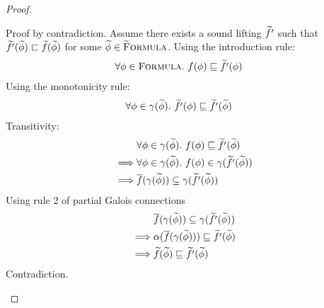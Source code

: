 \begin{proof}
\begin{description}
        Proof by contradiction.
        Assume there exists a sound lifting $\widetilde{f'}$ such that $\widetilde{f'}(\widetilde{\phi}) \sqsubset \widetilde{f}(\widetilde{\phi})$ for some $\widetilde{\phi} \in \textup{\textsc{\ensuremath{\widetilde{\text{F}}}ormula}}$.
        Using the introduction rule:
        \begin{align*}
        &\forall \phi \in \textup{\textsc{Formula}}.~ f(\phi) \sqsubseteq \widetilde{f'}(\phi)
        \end{align*}
        Using the monotonicity rule:
        \begin{align*}
        &\forall \phi \in \gamma(\widetilde{\phi}).~ \widetilde{f'}(\phi) \sqsubseteq \widetilde{f'}(\widetilde{\phi})
        \end{align*}
        Transitivity:
        \begin{align*}
        &\forall \phi \in \gamma(\widetilde{\phi}).~ f(\phi) \sqsubseteq \widetilde{f'}(\widetilde{\phi})\\
        \implies
        &\forall \phi \in \gamma(\widetilde{\phi}).~ f(\phi) \in \gamma(\widetilde{f'}(\widetilde{\phi}))\\
        \implies
        &\overline{f}(\gamma(\widetilde{\phi})) \subseteq \gamma(\widetilde{f'}(\widetilde{\phi}))\\
        \end{align*}
        Using rule 2 of partial Galois connections
        \begin{align*}
        &\overline{f}(\gamma(\widetilde{\phi})) \subseteq \gamma(\widetilde{f'}(\widetilde{\phi}))\\
        \implies
        &\alpha(\overline{f}(\gamma(\widetilde{\phi}))) \sqsubseteq \widetilde{f'}(\widetilde{\phi})\\
        \implies
        &\widetilde{f}(\widetilde{\phi}) \sqsubseteq \widetilde{f'}(\widetilde{\phi})\\
        \end{align*}
        Contradiction.
    \end{description}       
\end{proof}


